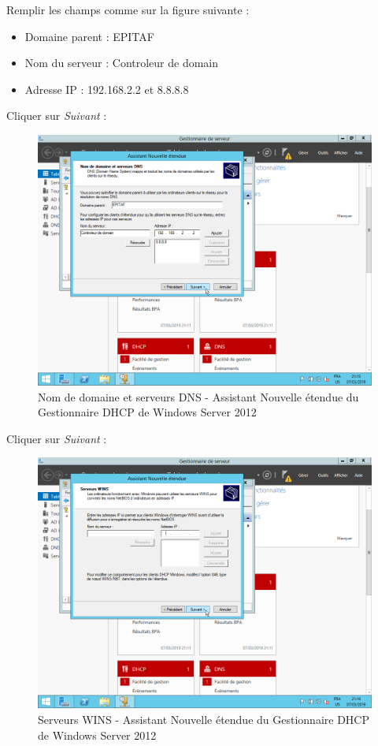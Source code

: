 \newpage
Remplir les champs comme sur la figure suivante :
\begin{itemize}
    \item Domaine parent : EPITAF
    \item Nom du serveur : Controleur de domain
    \item Adresse IP : 192.168.2.2 et 8.8.8.8
\end{itemize}
Cliquer sur \textit{Suivant} :
\begin{figure}[h!]
    \begin{center}
        \includegraphics[scale=0.6]{WS2012_Screenshots/49.png}
        \caption{Nom de domaine et serveurs DNS - Assistant Nouvelle étendue du Gestionnaire DHCP de Windows Server 2012}
        \label{WS2012_Screenshots/49}
    \end{center}
\end{figure}
\FloatBarrier

\newpage
Cliquer sur \textit{Suivant} :
\begin{figure}[h!]
    \begin{center}
        \includegraphics[scale=0.6]{WS2012_Screenshots/50.png}
        \caption{Serveurs WINS - Assistant Nouvelle étendue du Gestionnaire DHCP de Windows Server 2012}
        \label{WS2012_Screenshots/50}
    \end{center}
\end{figure}
\FloatBarrier

